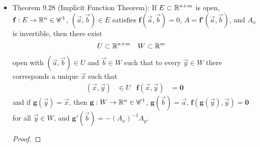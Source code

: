 \documentclass[../notes.tex]{subfiles}
\begin{document}
\begin{itemize}
\begin{proof}
\begin{equation*}
            A(\vec{h},\vec{k}) = A_x\vec{h}+A_y\vec{k}
            = \bm{0}
        \end{equation*}
        as desired.
    \end{proof}
    \item Theorem 9.28 (Implicit Function Theorem): If $E\subset\mathbb{R}^{n+m}$ is open, $\mathbf{f}:E\to\mathbb{R}^n\in\mathscr{C}^1$, $(\vec{a},\vec{b})\in E$ satisfies $\mathbf{f}(\vec{a},\vec{b})=0$, $A=\mathbf{f}'(\vec{a},\vec{b})$, and $A_x$ is invertible, then there exist
    \begin{align*}
        U &\subset \mathbb{R}^{n+m}&
        W &\subset \mathbb{R}^m
    \end{align*}
    open with $(\vec{a},\vec{b})\in U$ and $\vec{b}\in W$ such that to every $\vec{y}\in W$ there corresponds a unique $\vec{x}$ such that
    \begin{align*}
        (\vec{x},\vec{y}) &\in U&
        \mathbf{f}(\vec{x},\vec{y}) &= \bm{0}
    \end{align*}
    and if $\mathbf{g}(\vec{y})=\vec{x}$, then $\mathbf{g}:W\to\mathbb{R}^n\in\mathscr{C}^1$, $\mathbf{g}(\vec{b})=\vec{a}$, $\mathbf{f}(\mathbf{g}(\vec{y}),\vec{y})=\bm{0}$ for all $\vec{y}\in W$, and $\mathbf{g}'(\vec{b})=-(A_x)^{-1}A_y$.
    \begin{proof}

\end{proof}
\end{itemize}
\end{document}
